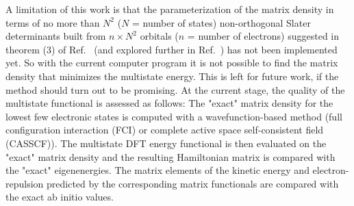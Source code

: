 \documentclass[journal=jacsat,manuscript=article]{achemso}
\begin{document}
%
%




A limitation of this work is that the parameterization of the matrix density in terms of no more than $N^2$ ($N$ = number of states)
non-orthogonal Slater determinants built from $n \times N^2$ orbitals ($n$ = number of electrons)
suggested in theorem (3) of Ref.~ \cite{Lu2022JPCL} (and explored further in Ref.~\cite{Lu2022fundamental}) has not been implemented yet. So with the current computer program it is
not possible to find the matrix density that minimizes the multistate energy. This is left for future work, if the method
should turn out to be promising. At the current stage, the quality of the multistate functional is assessed as follows:
The "exact" matrix density for the lowest few electronic states is computed
with a wavefunction-based method (full configuration interaction (FCI) or complete active space self-consistent field (CASSCF)).
The multistate DFT energy functional is then evaluated on the "exact" matrix density
and the resulting Hamiltonian matrix is compared with the "exact" eigenenergies.
The matrix elements of the kinetic energy and electron-repulsion predicted by the corresponding matrix functionals
are compared with the exact ab initio values.

\iffalse
\end{document}
